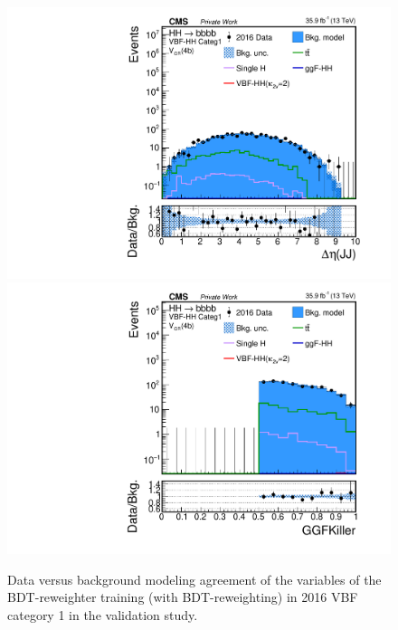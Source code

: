 \begin{figure}[htbp!]
\begin{center}
\includegraphics[width=0.24\linewidth]{Figures/Modeling/background/plotsDatadrivenWithBDT/2016/VBFcateg1_CR_210/Histogram/plot2016_j1j2_deltaEta_Btag4_VBFcateg1_CR_210_Histogram_log.pdf}
\includegraphics[width=0.24\linewidth]{Figures/Modeling/background/plotsDatadrivenWithBDT/2016/VBFcateg1_CR_210/Histogram/plot2016_GGFKiller_Btag4_VBFcateg1_CR_210_Histogram_log.pdf}
\end{center}
\caption{Data versus background modeling agreement of the variables of the BDT-reweighter training (with BDT-reweighting) in 2016 VBF category 1 in the validation study.}
\label{bkg:fig:valbdtregvarvbf1_2016}
\end{figure}

